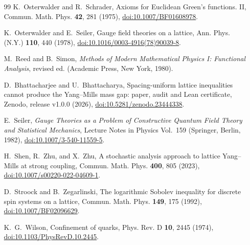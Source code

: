 \documentclass[aps,prd,twocolumn,superscriptaddress,nofootinbib,floatfix]{revtex4-2}
\theoremstyle{definition}
\theoremstyle{remark}
\begin{document}
\begin{thebibliography}{99}
K.~Osterwalder and R.~Schrader, Axioms for Euclidean Green's functions.
II, Commun. Math. Phys. \textbf{42}, 281 (1975),
\href{https://doi.org/10.1007/BF01608978}{doi:10.1007/BF01608978}.

K.~Osterwalder and E.~Seiler, Gauge field theories on a lattice, Ann.
Phys. (N.Y.) \textbf{110}, 440 (1978),
\href{https://doi.org/10.1016/0003-4916(78)90039-8}{doi:10.1016/0003-4916(78)90039-8}.

M.~Reed and B.~Simon, \emph{Methods of Modern Mathematical Physics I:
Functional Analysis}, revised ed. (Academic Press, New York, 1980).

D.~Bhattacharjee and U.~Bhattacharya, Spacing-uniform lattice inequalities
cannot produce the Yang--Mills mass gap: paper, audit and Lean certificate,
Zenodo, release v1.0.0 (2026),
\href{https://doi.org/10.5281/zenodo.23444338}{doi:10.5281/zenodo.23444338}.

E.~Seiler, \emph{Gauge Theories as a Problem of Constructive Quantum Field
Theory and Statistical Mechanics}, Lecture Notes in Physics Vol.~159
(Springer, Berlin, 1982),
\href{https://doi.org/10.1007/3-540-11559-5}{doi:10.1007/3-540-11559-5}.

H.~Shen, R.~Zhu, and X.~Zhu, A stochastic analysis approach to lattice
Yang--Mills at strong coupling, Commun. Math. Phys. \textbf{400}, 805
(2023), \href{https://doi.org/10.1007/s00220-022-04609-1}{doi:10.1007/s00220-022-04609-1}.

D.~Stroock and B.~Zegarlinski, The logarithmic Sobolev inequality for
discrete spin systems on a lattice, Commun. Math. Phys. \textbf{149}, 175
(1992), \href{https://doi.org/10.1007/BF02096629}{doi:10.1007/BF02096629}.

K.~G.~Wilson, Confinement of quarks, Phys. Rev. D \textbf{10}, 2445 (1974),
\href{https://doi.org/10.1103/PhysRevD.10.2445}{doi:10.1103/PhysRevD.10.2445}.

\end{thebibliography}
\end{document}

